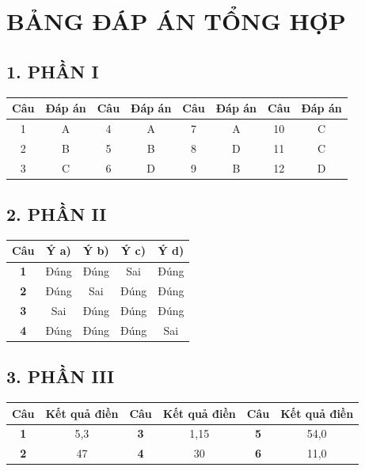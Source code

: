 \documentclass[12pt,a4paper]{article}
\begin{document}
\newpage
\section*{BẢNG ĐÁP ÁN TỔNG HỢP}

\subsection*{1. PHẦN I}
\begin{center}
\begin{tabular}{|c|c||c|c||c|c||c|c|}
\hline
\textbf{Câu} & \textbf{Đáp án} & \textbf{Câu} & \textbf{Đáp án} & \textbf{Câu} & \textbf{Đáp án} & \textbf{Câu} & \textbf{Đáp án} \\ \hline
1 & A & 4 & A & 7 & A & 10 & C \\ \hline
2 & B & 5 & B & 8 & D & 11 & C \\ \hline
3 & C & 6 & D & 9 & B & 12 & D \\ \hline
\end{tabular}
\end{center}

\subsection*{2. PHẦN II}
\begin{center}
\begin{tabular}{|c|c|c|c|c|}
\hline
\textbf{Câu} & \textbf{Ý a)} & \textbf{Ý b)} & \textbf{Ý c)} & \textbf{Ý d)} \\ \hline
\textbf{1} & Đúng & Đúng & Sai & Đúng \\ \hline
\textbf{2} & Đúng & Sai & Đúng & Đúng \\ \hline
\textbf{3} & Sai & Đúng & Đúng & Đúng \\ \hline
\textbf{4} & Đúng & Đúng & Đúng & Sai \\ \hline
\end{tabular}
\end{center}

\subsection*{3. PHẦN III}
\begin{center}
\begin{tabular}{|c|c||c|c||c|c|}
\hline
\textbf{Câu} & \textbf{Kết quả điền} & \textbf{Câu} & \textbf{Kết quả điền} & \textbf{Câu} & \textbf{Kết quả điền} \\ \hline
\textbf{1} & 5,3 & \textbf{3} & 1,15 & \textbf{5} & 54,0 \\ \hline
\textbf{2} & 47 & \textbf{4} & 30 & \textbf{6} & 11,0 \\ \hline
\end{tabular}
\end{center}
\end{document}
